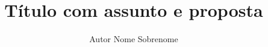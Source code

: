 \documentclass[a4paper,11pt]{report}
\newtheorem{crit \'{e}rio}{Crit \'{e}rio}
\begin{document}
\title{Título com assunto e proposta}
\author{Autor Nome Sobrenome}
\maketitle

%


\begin{abstract}
%

\end{abstract}

\tableofcontents
\listoffigures

\begin{acknowledgements}
\end{acknowledgements}














\appendix %

 




%


\end{document}
